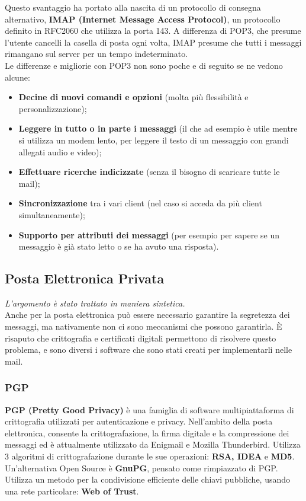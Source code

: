     Questo svantaggio ha portato alla nascita di un protocollo di consegna alternativo, \textbf{IMAP
    (Internet Message Access Protocol)}, un protocollo definito in RFC2060 che utilizza la porta
    143. A differenza di POP3, che presume l’utente cancelli la casella di posta ogni volta, IMAP
    presume che tutti i messaggi rimangano sul server per un tempo indeterminato.\\

    Le differenze e migliorie con POP3 non sono poche e di seguito se ne vedono alcune:
    \begin{itemize}
        \item \textbf{Decine di nuovi comandi e opzioni} (molta più flessibilità e personalizzazione);
        \item \textbf{Leggere in tutto o in parte i messaggi} (il che ad esempio è utile mentre si utilizza un
        modem lento, per leggere il testo di un messaggio con grandi allegati audio e video);
        \item \textbf{Effettuare ricerche indicizzate} (senza il bisogno di scaricare tutte le mail);
        \item \textbf{Sincronizzazione} tra i vari client (nel caso si acceda da più client simultaneamente);
        \item \textbf{Supporto per attributi dei messaggi} (per esempio per sapere se un messaggio è già
        stato letto o se ha avuto una risposta).
    \end{itemize}
    

    \subsection{Posta Elettronica Privata}
    \textit{L’argomento è stato trattato in maniera sintetica.}\\
        
    Anche per la posta elettronica può essere necessario garantire la segretezza dei messaggi, ma
    nativamente non ci sono meccanismi che possono garantirla. È risaputo che crittografia e
    certificati digitali permettono di risolvere questo problema, e sono diversi i software che sono
    stati creati per implementarli nelle mail.

        \subsubsection{PGP}
        \textbf{PGP (Pretty Good Privacy)} è una famiglia di software multipiattaforma di crittografia
        utilizzati per autenticazione e privacy. Nell’ambito della posta elettronica, consente la
        crittografazione, la firma digitale e la compressione dei messaggi ed è attualmente utilizzato da
        Enigmail e Mozilla Thunderbird. Utilizza 3 algoritmi di crittografazione durante le sue
        operazioni: \textbf{RSA, IDEA} e \textbf{MD5}.\\

        Un’alternativa Open Source è \textbf{GnuPG}, pensato come rimpiazzato di PGP. Utilizza un metodo per
        la condivisione efficiente delle chiavi pubbliche, usando una rete particolare: \textbf{Web of Trust}.
